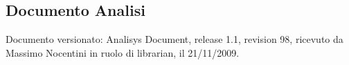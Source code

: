 \subsection{Documento Analisi}
Documento versionato: Analisys Document, release 1.1, revision 98, ricevuto da
Massimo Nocentini in ruolo di librarian, il 21/11/2009.
